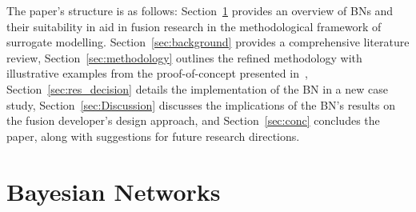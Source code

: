 \documentclass[journal]{IEEEtran}
\begin{document}
The paper's structure is as follows: Section~\ref{sec:BNs} provides an overview of BNs and their suitability in aid in fusion research in the methodological framework of surrogate modelling. Section~\ref{sec:background} provides a comprehensive literature review, Section~\ref{sec:methodology} outlines the refined methodology with illustrative examples from the proof-of-concept presented in~\cite{Griffiths2024}, Section~\ref{sec:res_decision} details the implementation of the BN in a new case study, Section~\ref{sec:Discussion} discusses the implications of the BN's results on the fusion developer's design approach, and Section~\ref{sec:conc} concludes the paper, along with suggestions for future research directions.

\section{Bayesian Networks}\label{sec:BNs}
\end{document}
